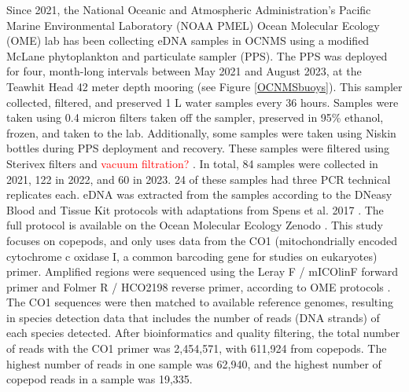 \documentclass[12pt,twoside]{reedthesis}
\begin{document}
Since 2021, the National Oceanic and Atmospheric Administration's Pacific Marine Environmental Laboratory (NOAA PMEL) Ocean Molecular Ecology (OME) lab has been collecting eDNA samples in OCNMS using a modified McLane phytoplankton and particulate sampler (PPS).  The PPS was deployed for four, month-long intervals between May 2021 and August 2023, at the Teawhit Head 42 meter depth mooring (see Figure \ref{OCNMSbuoys}). This sampler collected, filtered, and preserved 1 L water samples every 36 hours. Samples were taken using 0.4 micron filters taken off the sampler, preserved in 95\% ethanol, frozen, and taken to the lab. Additionally, some samples were taken using Niskin bottles during PPS deployment and recovery. These samples were filtered using Sterivex filters and \textcolor{red}{vacuum filtration? }. In total, 84 samples were collected in 2021, 122 in 2022, and 60 in 2023. 24 of these samples had three PCR technical replicates each. eDNA was extracted from the samples according to the DNeasy Blood and Tissue Kit protocols with adaptations from Spens et al. 2017 \autocite{Spens2017}. The full protocol is available on the Ocean Molecular Ecology Zenodo \autocite{Weinrich2025}. This study focuses on copepods, and only uses data from the CO1 (mitochondrially encoded cytochrome c oxidase I, a common barcoding gene for studies on eukaryotes) primer. Amplified regions were sequenced using the  Leray F / mICOlinF forward primer and Folmer R / HCO2198 reverse primer, according to OME protocols \autocite{Gold2024, Spens2017}. The CO1 sequences were then matched to available reference genomes, resulting in species detection data that includes the number of reads (DNA strands) of each species detected. After bioinformatics and quality filtering, the total number of reads with the CO1 primer was 2,454,571, with 611,924 from copepods. The highest number of reads in one sample was 62,940, and the highest number of copepod reads in a sample was 19,335.
\end{document}
